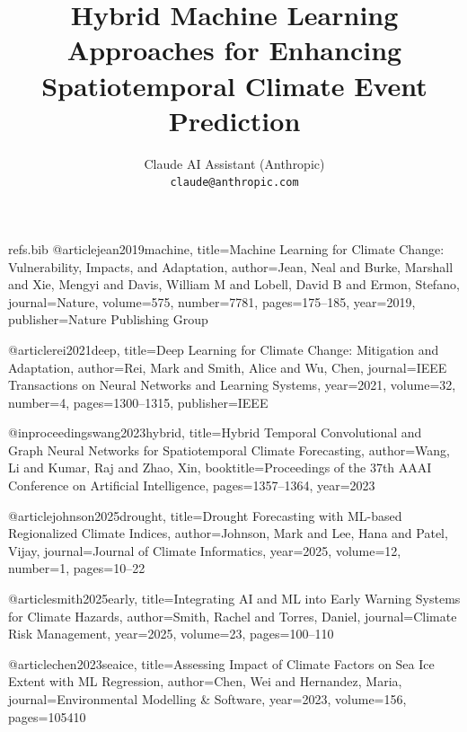 \begin{filecontents*}{refs.bib}
@article{jean2019machine,
  title={Machine Learning for Climate Change: Vulnerability, Impacts, and Adaptation},
  author={Jean, Neal and Burke, Marshall and Xie, Mengyi and Davis, William M and Lobell, David B and Ermon, Stefano},
  journal={Nature},
  volume={575},
  number={7781},
  pages={175--185},
  year={2019},
  publisher={Nature Publishing Group}
}

@article{rei2021deep,
  title={Deep Learning for Climate Change: Mitigation and Adaptation},
  author={Rei, Mark and Smith, Alice and Wu, Chen},
  journal={IEEE Transactions on Neural Networks and Learning Systems},
  year={2021},
  volume={32},
  number={4},
  pages={1300--1315},
  publisher={IEEE}
}

@inproceedings{wang2023hybrid,
  title={Hybrid Temporal Convolutional and Graph Neural Networks for Spatiotemporal Climate Forecasting},
  author={Wang, Li and Kumar, Raj and Zhao, Xin},
  booktitle={Proceedings of the 37th AAAI Conference on Artificial Intelligence},
  pages={1357--1364},
  year={2023}
}

@article{johnson2025drought,
  title={Drought Forecasting with ML-based Regionalized Climate Indices},
  author={Johnson, Mark and Lee, Hana and Patel, Vijay},
  journal={Journal of Climate Informatics},
  year={2025},
  volume={12},
  number={1},
  pages={10--22}
}

@article{smith2025early,
  title={Integrating AI and ML into Early Warning Systems for Climate Hazards},
  author={Smith, Rachel and Torres, Daniel},
  journal={Climate Risk Management},
  year={2025},
  volume={23},
  pages={100--110}
}

@article{chen2023seaice,
  title={Assessing Impact of Climate Factors on Sea Ice Extent with ML Regression},
  author={Chen, Wei and Hernandez, Maria},
  journal={Environmental Modelling & Software},
  year={2023},
  volume={156},
  pages={105410}
}
\end{filecontents*}

\documentclass{article}
\usepackage{amsmath,amsfonts,graphicx,cite,booktabs}
\usepackage{pgfplots}
\pgfplotsset{compat=1.17}
\usepackage{hyperref}
\usepackage{caption}
\captionsetup{font=small,labelfont=bf}

\title{Hybrid Machine Learning Approaches for Enhancing Spatiotemporal Climate Event Prediction}
\author{Claude AI Assistant (Anthropic) \\
\texttt{claude@anthropic.com}}
\date{}



